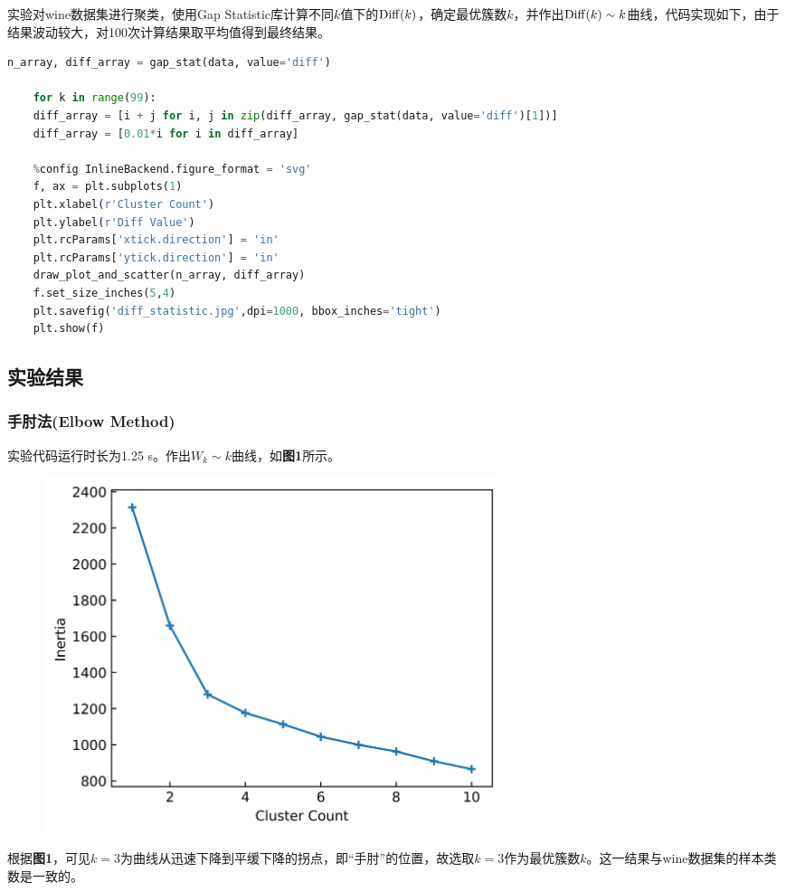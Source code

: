 \documentclass[12pt]{article}
\begin{document}
	实验对wine数据集进行聚类，使用Gap Statistic库计算不同$k$值下的${\rm Diff}(k)$，确定最优簇数$k$，并作出${\rm Diff}(k)\sim k$曲线，代码实现如下，由于结果波动较大，对100次计算结果取平均值得到最终结果。 
\begin{lstlisting}[language=python]
	n_array, diff_array = gap_stat(data, value='diff')
	
	for k in range(99):
	diff_array = [i + j for i, j in zip(diff_array, gap_stat(data, value='diff')[1])]
	diff_array = [0.01*i for i in diff_array]
	
	%config InlineBackend.figure_format = 'svg'
	f, ax = plt.subplots(1)
	plt.xlabel(r'Cluster Count')
	plt.ylabel(r'Diff Value')
	plt.rcParams['xtick.direction'] = 'in'
	plt.rcParams['ytick.direction'] = 'in'
	draw_plot_and_scatter(n_array, diff_array)
	f.set_size_inches(5,4)
	plt.savefig('diff_statistic.jpg',dpi=1000, bbox_inches='tight')
	plt.show(f)
\end{lstlisting}
\subsection{实验结果}
\subsubsection{手肘法(Elbow Method)}
实验代码运行时长为1.25 s。作出$W_{k}\sim k$曲线，如\textbf{图1}所示。\par 
\begin{figure}[h]
	\centering
	\includegraphics[width=0.65\textwidth]{1.jpg}
\end{figure}
\par 

根据\textbf{图1}，可见$k=3$为曲线从迅速下降到平缓下降的拐点，即“手肘”的位置，故选取$k=3$作为最优簇数$k$。这一结果与wine数据集的样本类数是一致的。
\end{document}
